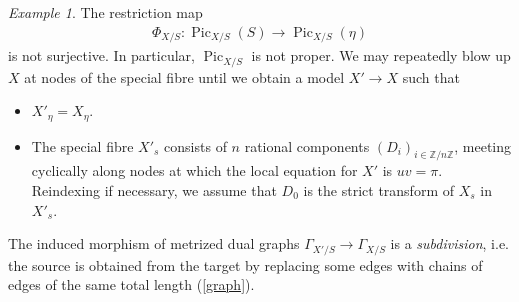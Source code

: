 \documentclass[a4paper,11pt]{amsart} %
\numberwithin{equation}{subsection}
\newcommand{\on}[1]{\operatorname{#1}}
\newcommand{\bb}[1]{{\mathbb{#1}}}
\theoremstyle{definition}
\theoremstyle{plain}%
\theoremstyle{remark}
\newtheorem{example}[definition]{Example}
\begin{document}
\begin{example}
    The restriction map
    \begin{align}\label{eqn:restriction_map_pic_DVR_0}
        \Phi_{X/S} \colon \on{Pic}_{X/S}(S) \to \on{Pic}_{X/S}(\eta)
    \end{align}
    is not surjective. In particular, $\on{Pic}_{X/S}$ is not proper. We may repeatedly blow up $X$ at nodes of the special fibre until we obtain a model $X' \to X$ such that
    \begin{itemize}
        \item $X'_\eta = X_\eta$.
        \item The special fibre $X'_s$ consists of $n$ rational components $(D_i)_{i\in \bb Z/n\bb Z}$, meeting cyclically along nodes at which the local equation for $X'$ is $uv=\pi$. Reindexing if necessary, we assume that $D_0$ is the strict transform of $X_s$ in $X'_s$.
    \end{itemize}
    




The induced morphism of metrized dual graphs $\Gamma_{X'/S} \to \Gamma_{X/S}$ is a \emph{subdivision}, i.e. the source is obtained from the target by replacing some edges with chains of edges of the same total length (\ref{graph}).
\begin{figure}[ht]
    \begin{center}


\end{center}
\end{figure}
\end{example}
\end{document}
